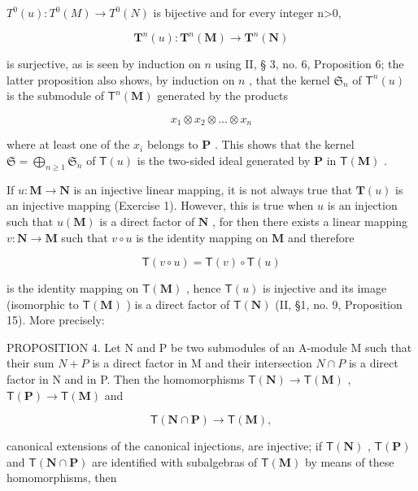 \(T^{0}(u):T^{0}(M)\rightarrow T^{0}(N)\) is bijective and for every integer n\textgreater0,

\[
\mathbf {T} ^ {n} (u): \mathbf {T} ^ {n} (\mathbf {M}) \rightarrow \mathbf {T} ^ {n} (\mathbf {N})
\]

is surjective, as is seen by induction on \(n\) using II, § 3, no. 6, Proposition 6; the latter proposition also shows, by induction on \(n\) , that the kernel \(\mathfrak{S}_n\) of \(\mathsf{T}^n(u)\) is the submodule of \(\mathsf{T}^n(\mathbf{M})\) generated by the products

\[
x _ {1} \otimes x _ {2} \otimes \dots \otimes x _ {n}
\]

where at least one of the \(x_{i}\) belongs to \(\mathbf{P}\) . This shows that the kernel \(\mathfrak{S} = \bigoplus_{n\geqslant 1}\mathfrak{S}_n\) of \(\mathsf{T}(u)\) is the two-sided ideal generated by \(\mathbf{P}\) in \(\mathsf{T}(\mathbf{M})\) .

If \(u: \mathbf{M} \to \mathbf{N}\) is an injective linear mapping, it is not always true that \(\mathbf{T}(u)\) is an injective mapping (Exercise 1). However, this is true when \(u\) is an injection such that \(u(\mathbf{M})\) is a direct factor of \(\mathbf{N}\) , for then there exists a linear mapping \(v: \mathbf{N} \to \mathbf{M}\) such that \(v \circ u\) is the identity mapping on \(\mathbf{M}\) and therefore

\[
\mathsf {T} (v \circ u) = \mathsf {T} (v) \circ \mathsf {T} (u)
\]

is the identity mapping on \(\mathsf{T}(\mathbf{M})\) , hence \(\mathsf{T}(u)\) is injective and its image (isomorphic to \(\mathsf{T}(\mathbf{M})\) ) is a direct factor of \(\mathsf{T}(\mathbf{N})\) (II, §1, no. 9, Proposition 15). More precisely:

PROPOSITION 4. Let N and P be two submodules of an A-module M such that their sum \(N + P\) is a direct factor in M and their intersection \(N \cap P\) is a direct factor in N and in P. Then the homomorphisms \(\mathsf{T}(\mathbf{N}) \to \mathsf{T}(\mathbf{M})\) , \(\mathsf{T}(\mathbf{P}) \to \mathsf{T}(\mathbf{M})\) and

\[
\mathsf {T} (\mathbf {N} \cap \mathbf {P}) \rightarrow \mathsf {T} (\mathbf {M}),
\]

canonical extensions of the canonical injections, are injective; if \(\mathsf{T}(\mathbf{N})\) , \(\mathsf{T}(\mathbf{P})\) and \(\mathsf{T}(\mathbf{N} \cap \mathbf{P})\) are identified with subalgebras of \(\mathsf{T}(\mathbf{M})\) by means of these homomorphisms, then

